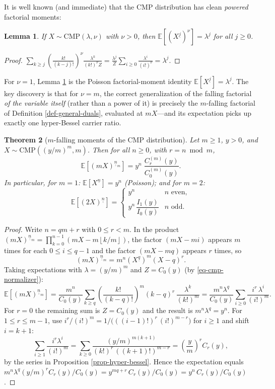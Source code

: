 \documentclass[a4paper]{amsart}
\numberwithin{equation}{section}
\newcommand{\uuline}[1]{\underline{\underline{#1}}}
\newcommand{\floor}[1]{\left\lfloor #1 \right\rfloor}
\newtheorem{theorem}{Theorem}[section]
\newtheorem{lemma}[theorem]{Lemma}
\begin{document}
It is well known (and immediate) that the CMP distribution has clean \emph{powered} factorial moments:
\begin{lemma}\label{lem-cmp-factorial}
If $X \sim \mathrm{CMP}(\lambda, \nu)$ with $\nu > 0$, then $\mathbb{E}\left[\left(X^{\underline{j}}\right)^{\nu}\right] = \lambda^j$ for all $j \geq 0$.
\end{lemma}
\begin{proof}
$\displaystyle \sum_{k\ge j}\left(\frac{k!}{(k-j)!}\right)^{\!\nu}\frac{\lambda^k}{(k!)^\nu Z} = \frac{\lambda^j}{Z}\sum_{i \ge 0}\frac{\lambda^{i}}{(i!)^\nu} = \lambda^j. $
\end{proof}

For $\nu = 1$, Lemma \ref{lem-cmp-factorial} is the Poisson factorial-moment identity $\mathbb{E}[X^{\underline{j}}] = \lambda^j$. The key discovery is that for $\nu = m$, the correct generalization of the falling factorial \emph{of the variable itself} (rather than a power of it) is precisely the $m$-falling factorial of Definition \ref{def-general-duals}, evaluated at $mX$---and its expectation picks up exactly one hyper-Bessel carrier ratio.

\begin{theorem}[$m$-falling moments of the CMP distribution]\label{thm-cmp-falling}
Let $m \geq 1$, $y > 0$, and $X \sim \mathrm{CMP}\!\left((y/m)^m, m\right)$. Then for all $n \geq 0$, with $r = n \bmod m$,
\[
\mathbb{E}\left[(mX)^{\uuline{n}_m}\right] = y^{n}\;\frac{C^{(m)}_{r}(y)}{C^{(m)}_0(y)}.
\]
In particular, for $m = 1$: $\mathbb{E}[X^{\underline{n}}] = y^n$ (Poisson); and for $m=2$:
\[
\mathbb{E}\left[(2X)^{\uuline{n}}\right] = \begin{cases} y^n & n \text{ even}, \\[2pt] y^n\, \dfrac{I_1(y)}{I_0(y)} & n \text{ odd}. \end{cases}
\]
\end{theorem}
\begin{proof}
Write $n = qm + r$ with $0 \le r < m$. In the product $(mX)^{\uuline{n}_m} = \prod_{k=0}^{n-1}(mX - m\floor{k/m})$, the factor $(mX - mi)$ appears $m$ times for each $0 \le i \le q - 1$ and the factor $(mX - mq)$ appears $r$ times, so
\[
(mX)^{\uuline{n}_m} = m^{n}\left(X^{\underline{q}}\right)^{m}(X - q)^{r}.
\]
Taking expectations with $\lambda = (y/m)^m$ and $Z = C_0(y)$ (by \eqref{eq-cmp-normalizer}):
\[
\mathbb{E}\left[(mX)^{\uuline{n}_m}\right] = \frac{m^n}{C_0(y)}\sum_{k \geq q} \left(\frac{k!}{(k-q)!}\right)^{m} (k-q)^r\, \frac{\lambda^k}{(k!)^m}
= \frac{m^n \lambda^q}{C_0(y)}\sum_{i \geq 0} \frac{i^r\,\lambda^{i}}{(i!)^m}.
\]
For $r = 0$ the remaining sum is $Z = C_0(y)$ and the result is $m^n\lambda^q = y^n$. For $1 \le r \le m-1$, use $i^r/(i!)^m = 1/\big(((i-1)!)^r\,(i!)^{m-r}\big)$ for $i \geq 1$ and shift $i = k+1$:
\[
\sum_{i \geq 1} \frac{i^r \lambda^i}{(i!)^m} = \sum_{k \geq 0}\frac{(y/m)^{m(k+1)}}{(k!)^r\,((k+1)!)^{m-r}} = \left(\frac{y}{m}\right)^{r} C_r(y),
\]
by the series in Proposition \ref{prop-hyper-bessel}. Hence the expectation equals $m^n \lambda^q (y/m)^r C_r(y)/C_0(y) = y^{mq+r}\,C_r(y)/C_0(y) = y^n\, C_r(y)/C_0(y)$.
\end{proof}
\end{document}
